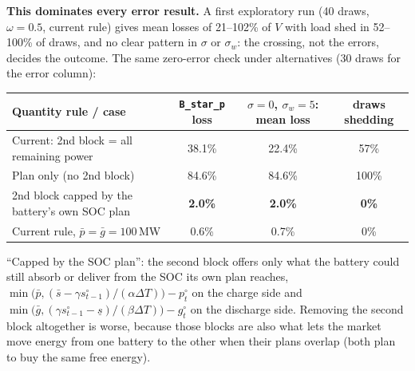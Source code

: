 \documentclass[10pt,a4paper]{article}
\newcommand{\code}[1]{\texttt{#1}}
\begin{document}
\textbf{This dominates every error result.} A first exploratory run (40 draws, $\omega=0.5$, current rule)
gives mean losses of 21--102\% of $V$ with load shed in 52--100\% of draws, and no clear pattern in
$\sigma$ or $\sigma_w$: the crossing, not the errors, decides the outcome. The same zero-error check under
alternatives (30 draws for the error column):
\begin{center}\small
\begin{tabular}{@{}lccc@{}}
\toprule
Quantity rule / case & \code{B\_star\_p} loss & $\sigma=0$, $\sigma_w=5$: mean loss & draws shedding\\
\midrule
Current: 2nd block = all remaining power & 38.1\% & 22.4\% & 57\%\\
Plan only (no 2nd block) & 84.6\% & 84.6\% & 100\%\\
2nd block capped by the battery's own SOC plan & \textbf{2.0\%} & \textbf{2.0\%} & \textbf{0\%}\\
Current rule, $\bar p=\bar g=100$\,MW & 0.6\% & 0.7\% & 0\%\\
\bottomrule
\end{tabular}
\end{center}
``Capped by the SOC plan'': the second block offers only what the battery could still absorb or deliver from
the SOC its own plan reaches, $\min\!\big(\bar p,(\bar s-\gamma s^\circ_{t-1})/(\alpha\Delta T)\big)-p^\circ_t$ on
the charge side and $\min\!\big(\bar g,(\gamma s^\circ_{t-1}-\underline s)/(\beta\Delta T)\big)-g^\circ_t$ on
the discharge side. Removing the second block altogether is worse, because those blocks are also what lets the
market move energy from one battery to the other when their plans overlap (both plan to buy the same free
energy).

\begin{center}
\end{center}
\end{document}
